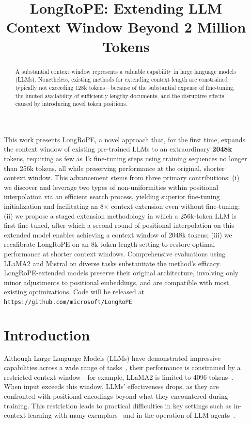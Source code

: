 \title{LongRoPE: Extending LLM Context Window Beyond 2 Million Tokens}

\begin{abstract}
A substantial context window represents a valuable capability in large language models (LLMs). Nonetheless, existing methods for extending context length are constrained—typically not exceeding 128k tokens—because of the substantial expense of fine-tuning, the limited availability of sufficiently lengthy documents, and the disruptive effects caused by introducing novel token positions.
\end{abstract}

This work presents LongRoPE, a novel approach that, for the first time, expands the context window of existing pre-trained LLMs to an extraordinary \textbf{2048k} tokens, requiring as few as 1k fine-tuning steps using training sequences no longer than 256k tokens, all while preserving performance at the original, shorter context window. This advancement stems from three primary contributions: (i) we discover and leverage two types of non-uniformities within positional interpolation via an efficient search process, yielding superior fine-tuning initialization and facilitating an 8$\times$ context extension even without fine-tuning; (ii) we propose a staged extension methodology in which a 256k-token LLM is first fine-tuned, after which a second round of positional interpolation on this extended model enables achieving a context window of 2048k tokens; (iii) we recalibrate LongRoPE on an 8k-token length setting to restore optimal performance at shorter context windows. Comprehensive evaluations using LLaMA2 and Mistral on diverse tasks substantiate the method’s efficacy. LongRoPE-extended models preserve their original architecture, involving only minor adjustments to positional embeddings, and are compatible with most existing optimizations. Code will be released at \texttt{https://github.com/microsoft/LongRoPE}

\section{Introduction}

Although Large Language Models (LLMs) have demonstrated impressive capabilities across a wide range of tasks~\cite{gpt4,llama2}, their performance is constrained by a restricted context window—for example, LLaMA2 is limited to 4096 tokens~\cite{llama2}. When input exceeds this window, LLMs' effectiveness drops, as they are confronted with positional encodings beyond what they encountered during training. This restriction leads to practical difficulties in key settings such as in-context learning with many exemplars~\cite{Huang2023FewerIM} and in the operation of LLM agents~\cite{park2023generative,madaan2023selfrefine}.


